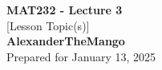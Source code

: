 \begin{titlepage}
    \null %
    \vfill
    \begin{center}
        {\fontsize{40}{48}\selectfont \bfseries MAT232 - Lecture 3}
        \vspace{20pt} \\
        {\LARGE [Lesson Topic(s)]} \\
        \vspace{20pt}
        \textbf{AlexanderTheMango}
        \vspace{8pt}
        \\ Prepared for January 13, 2025
    \end{center}
    \vfill
\end{titlepage}
